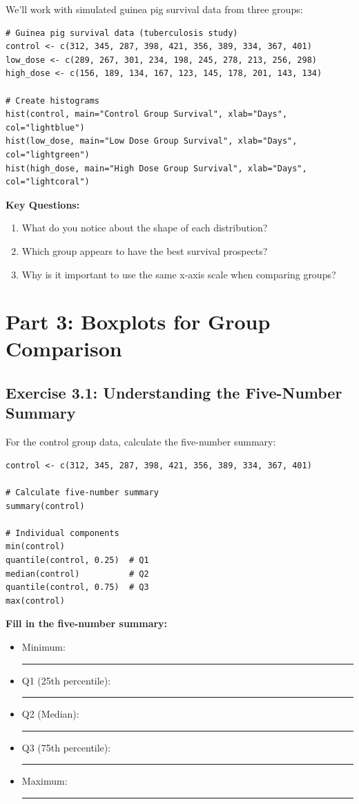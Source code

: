 \documentclass[11pt]{article}
\begin{document}
We'll work with simulated guinea pig survival data from three groups:

\begin{lstlisting}
# Guinea pig survival data (tuberculosis study)
control <- c(312, 345, 287, 398, 421, 356, 389, 334, 367, 401)
low_dose <- c(289, 267, 301, 234, 198, 245, 278, 213, 256, 298)
high_dose <- c(156, 189, 134, 167, 123, 145, 178, 201, 143, 134)

# Create histograms
hist(control, main="Control Group Survival", xlab="Days", col="lightblue")
hist(low_dose, main="Low Dose Group Survival", xlab="Days", col="lightgreen")
hist(high_dose, main="High Dose Group Survival", xlab="Days", col="lightcoral")
\end{lstlisting}

\textbf{Key Questions:}
\begin{enumerate}
\item What do you notice about the shape of each distribution?
\item Which group appears to have the best survival prospects?
\item Why is it important to use the same x-axis scale when comparing groups?
\end{enumerate}

\section{Part 3: Boxplots for Group Comparison}

\subsection{Exercise 3.1: Understanding the Five-Number Summary}

For the control group data, calculate the five-number summary:

\begin{lstlisting}
control <- c(312, 345, 287, 398, 421, 356, 389, 334, 367, 401)

# Calculate five-number summary
summary(control)

# Individual components
min(control)
quantile(control, 0.25)  # Q1
median(control)          # Q2
quantile(control, 0.75)  # Q3
max(control)
\end{lstlisting}

\textbf{Fill in the five-number summary:}
\begin{itemize}
\item Minimum: \rule{2cm}{0.4pt}
\item Q1 (25th percentile): \rule{2cm}{0.4pt}
\item Q2 (Median): \rule{2cm}{0.4pt}
\item Q3 (75th percentile): \rule{2cm}{0.4pt}
\item Maximum: \rule{2cm}{0.4pt}
\end{itemize}
\end{document}
